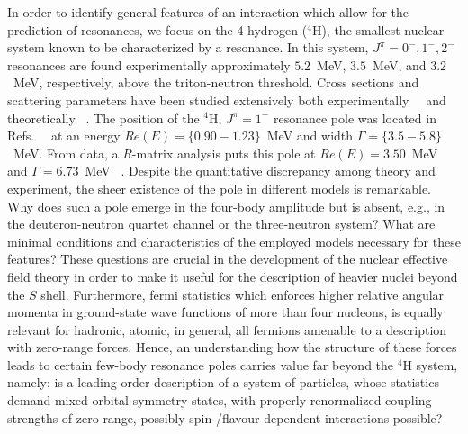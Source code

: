\documentclass[aps,onecolumn,preprintnumbers,amsmath,amssymb,nofootinbib,superscriptaddress,notitlepage]{revtex4-1}
\begin{document}
%
In order to identify general features of an interaction which allow for the
prediction of resonances, we focus on  the 4-hydrogen ($^4$H), the smallest nuclear system known to
be characterized by a resonance.
In this system, $J^\pi=0^-, 1^-, 2^-$ resonances are found experimentally approximately
$5.2$~MeV, $3.5$~MeV, and $3.2$~MeV, respectively, above the triton-neutron threshold.
Cross sections and scattering parameters have been studied extensively both experimentally
~\cite{osti_4230875, Phillips:1980zz, Tilley:1992zz}~and theoretically~
\cite{Ciesielski:1997vy,Ciesielski:1998sy,Ciesielski:1999pp,Viviani:1998gr,Fonseca:1999zz,Lazauskas:2004uq}.
The position of the $^4$H, $J^\pi=1^-$ resonance pole was located in
Refs.~\cite{Arai:2003ek,deDiego:2007rd,Lazauskas:2019cxj}~ at an energy
$Re(E)=\{0.90 - 1.23\}$~MeV and width $\Gamma=\{3.5 - 5.8\}$~MeV.
From data, a $R$-matrix analysis puts this pole at $Re(E)=3.50$~MeV and $\Gamma=6.73$~MeV~
\cite{Tilley:1992zz}.
Despite the quantitative discrepancy among theory and experiment, the sheer existence of the pole in different models is remarkable.
%
%
%
Why does
such a pole emerge in the four-body amplitude but is absent, e.g., in the
deuteron-neutron quartet channel or the three-neutron system? What are minimal
conditions and characteristics of the employed models necessary for these features?
These questions are crucial in the development of the nuclear effective field
theory in order to make it useful for the description of heavier nuclei beyond
the $S$ shell.
Furthermore, fermi statistics which enforces higher relative angular
momenta in ground-state wave functions of more than four nucleons, is equally
relevant for hadronic, atomic, in general, all fermions amenable
to a description with zero-range forces. Hence, an understanding how the structure
of these forces leads to certain few-body resonance poles carries value far beyond the
$^4$H system, namely: is a leading-order description of a system of particles, whose
statistics demand mixed-orbital-symmetry states, with properly renormalized coupling
strengths of zero-range, possibly spin-/flavour-dependent interactions possible?
%
%
%
%
\end{document}
